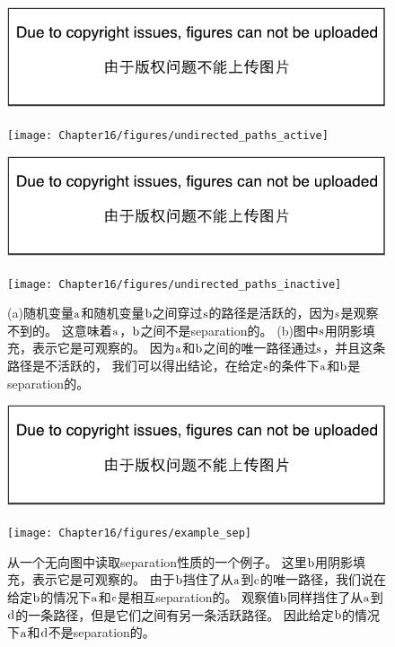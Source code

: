 \begin{figure}[!htb]
\ifOpenSource
\centerline{\includegraphics{figure.pdf}}
\else
	\centerline{\texttt{[image: Chapter16/figures/undirected\_paths\_active]}}
\fi
\ifOpenSource
\centerline{\includegraphics{figure.pdf}}
\else
	\centerline{\texttt{[image: Chapter16/figures/undirected\_paths\_inactive]}}	
\fi
\caption{(a)随机变量$\mathrm{a}$和随机变量$\mathrm{b}$之间穿过$\mathrm{s}$的路径是活跃的，因为$\mathrm{s}$是观察不到的。
这意味着$\mathrm{a}$，$\mathrm{b}$之间不是\gls{separation}的。
 (b)图中$\mathrm{s}$用阴影填充，表示它是可观察的。
因为$\mathrm{a}$和$\mathrm{b}$之间的唯一路径通过$\mathrm{s}$，并且这条路径是不活跃的，
我们可以得出结论，在给定$\mathrm{s}$的条件下$\mathrm{a}$和$\mathrm{b}$是\gls{separation}的。}
\label{fig:undirected_paths_active}
\end{figure}

\begin{figure}[!htb]
\ifOpenSource
\centerline{\includegraphics{figure.pdf}}
\else
	\centerline{\texttt{[image: Chapter16/figures/example\_sep]}}
\fi
\caption{从一个无向图中读取\gls{separation}性质的一个例子。
这里$\mathrm{b}$用阴影填充，表示它是可观察的。
由于$\mathrm{b}$挡住了从$\mathrm{a}$到$\mathrm{c}$的唯一路径，我们说在给定$\mathrm{b}$的情况下$\mathrm{a}$和$\mathrm{c}$是相互\gls{separation}的。
观察值$\mathrm{b}$同样挡住了从$\mathrm{a}$到$\mathrm{d}$的一条路径，但是它们之间有另一条活跃路径。
因此给定$\mathrm{b}$的情况下$\mathrm{a}$和$\mathrm{d}$不是\gls{separation}的。}
	\label{fig:example_sep}
\end{figure}



